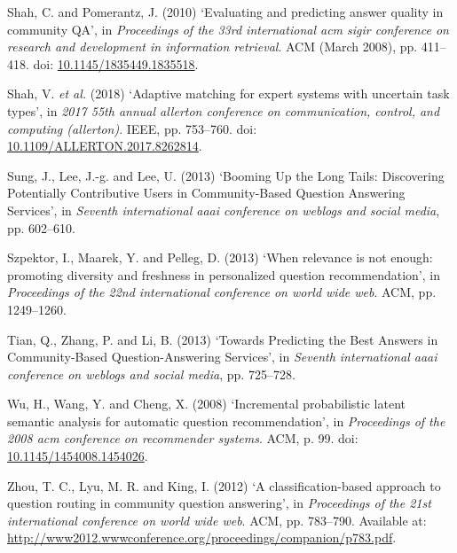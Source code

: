 \documentclass[11pt,preprint, authoryear]{article}
\numberwithin{equation}{section}
\numberwithin{figure}{section}
\begin{document}
\hypertarget{ref-Shah2010}{}
Shah, C. and Pomerantz, J. (2010) `Evaluating and predicting answer
quality in community QA', in \emph{Proceedings of the 33rd international
acm sigir conference on research and development in information
retrieval}. ACM (March 2008), pp. 411--418. doi:
\href{https://doi.org/10.1145/1835449.1835518}{10.1145/1835449.1835518}.

\hypertarget{ref-Shah2018}{}
Shah, V. \emph{et al.} (2018) `Adaptive matching for expert systems with
uncertain task types', in \emph{2017 55th annual allerton conference on
communication, control, and computing (allerton)}. IEEE, pp. 753--760.
doi:
\href{https://doi.org/10.1109/ALLERTON.2017.8262814}{10.1109/ALLERTON.2017.8262814}.

\hypertarget{ref-Sung2013}{}
Sung, J., Lee, J.-g. and Lee, U. (2013) `Booming Up the Long Tails:
Discovering Potentially Contributive Users in Community-Based Question
Answering Services', in \emph{Seventh international aaai conference on
weblogs and social media}, pp. 602--610.

\hypertarget{ref-Szpektor2013}{}
Szpektor, I., Maarek, Y. and Pelleg, D. (2013) `When relevance is not
enough: promoting diversity and freshness in personalized question
recommendation', in \emph{Proceedings of the 22nd international
conference on world wide web}. ACM, pp. 1249--1260.

\hypertarget{ref-Tian2013}{}
Tian, Q., Zhang, P. and Li, B. (2013) `Towards Predicting the Best
Answers in Community-Based Question-Answering Services', in
\emph{Seventh international aaai conference on weblogs and social
media}, pp. 725--728.

\hypertarget{ref-Wu2008}{}
Wu, H., Wang, Y. and Cheng, X. (2008) `Incremental probabilistic latent
semantic analysis for automatic question recommendation', in
\emph{Proceedings of the 2008 acm conference on recommender systems}.
ACM, p. 99. doi:
\href{https://doi.org/10.1145/1454008.1454026}{10.1145/1454008.1454026}.

\hypertarget{ref-Zhou2012}{}
Zhou, T. C., Lyu, M. R. and King, I. (2012) `A classification-based
approach to question routing in community question answering', in
\emph{Proceedings of the 21st international conference on world wide
web}. ACM, pp. 783--790. Available at:
\url{http://www2012.wwwconference.org/proceedings/companion/p783.pdf}.

\newcommand\wordcount{
    \immediate\write18{texcount -sub=section \jobname.tex  | grep "Section" |     sed -e 's/+.*//' | sed -n \thesection p > 'count.txt'}
(words)}
\end{document}
